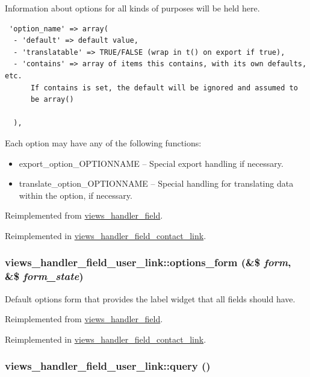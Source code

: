 Information about options for all kinds of purposes will be held here. 

\begin{Code}\begin{verbatim} 'option_name' => array(
  - 'default' => default value,
  - 'translatable' => TRUE/FALSE (wrap in t() on export if true),
  - 'contains' => array of items this contains, with its own defaults, etc.
      If contains is set, the default will be ignored and assumed to
      be array()

  ),
\end{verbatim}
\end{Code}

 Each option may have any of the following functions:\begin{itemize}
\item export\_\-option\_\-OPTIONNAME -- Special export handling if necessary.\item translate\_\-option\_\-OPTIONNAME -- Special handling for translating data within the option, if necessary. \end{itemize}


Reimplemented from \hyperlink{classviews__handler__field_64c69a8a3697603f8283405071c25b76}{views\_\-handler\_\-field}.

Reimplemented in \hyperlink{classviews__handler__field__contact__link_33c1b1091d417e0e5a1b82bfdc81b83b}{views\_\-handler\_\-field\_\-contact\_\-link}.\hypertarget{classviews__handler__field__user__link_952944015feaaab1fb2d0abc29d5c2b5}{
\subsubsection[{options\_\-form}]{\setlength{\rightskip}{0pt plus 5cm}views\_\-handler\_\-field\_\-user\_\-link::options\_\-form (\&\$ {\em form}, \/  \&\$ {\em form\_\-state})}}
\label{classviews__handler__field__user__link_952944015feaaab1fb2d0abc29d5c2b5}


Default options form that provides the label widget that all fields should have. 

Reimplemented from \hyperlink{classviews__handler__field_0435d161922b7b4b84f02a2e79bb947a}{views\_\-handler\_\-field}.

Reimplemented in \hyperlink{classviews__handler__field__contact__link_d6709f7a6f48dc51fe3952f26598e622}{views\_\-handler\_\-field\_\-contact\_\-link}.\hypertarget{classviews__handler__field__user__link_b64eedee54360407b203c3d7474c40f2}{
\subsubsection[{query}]{\setlength{\rightskip}{0pt plus 5cm}views\_\-handler\_\-field\_\-user\_\-link::query ()}}
\label{classviews__handler__field__user__link_b64eedee54360407b203c3d7474c40f2}


